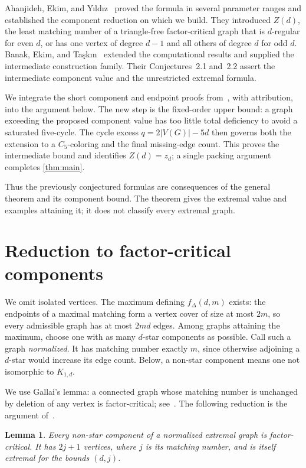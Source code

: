 \documentclass[11pt]{article}
\newtheorem{lemma}[theorem]{Lemma}
\theoremstyle{definition}
\theoremstyle{remark}
\newcommand{\fDelta}{f_{\Delta}}
\begin{document}
Ahanjideh, Ekim, and Y\i ld\i z~\cite{AEY2022} proved the formula in several
parameter ranges and established the component reduction on which we build.
They introduced $Z(d)$, the least matching number of a triangle-free
factor-critical graph that is $d$-regular for even $d$, or has one vertex of
degree $d-1$ and all others of degree $d$ for odd $d$. Banak, Ekim, and
Ta\c{s}k\i n~\cite{BET2023} extended the computational results and supplied
the intermediate construction family. Their Conjectures~2.1 and~2.2 assert
the intermediate component value and the unrestricted extremal formula.

We integrate the short component and endpoint proofs from~\cite{AEY2022},
with attribution, into the argument below. The new step is the fixed-order
upper bound: a graph exceeding the proposed component value has too little
total deficiency to avoid a saturated five-cycle. The cycle excess
$q=2|V(G)|-5d$ then governs both the extension to a $C_5$-coloring and the
final missing-edge count. This proves the intermediate bound and identifies
$Z(d)=z_d$; a single packing argument completes \cref{thm:main}.

Thus the previously conjectured formulas are consequences of the general
theorem and its component bound. The theorem gives the extremal value and
examples attaining it; it does not classify every extremal graph.

\section{Reduction to factor-critical components}\label{sec:reduction}

We omit isolated vertices. The maximum defining $\fDelta(d,m)$ exists:
the endpoints of a maximal matching form a vertex cover of size at most
$2m$, so every admissible graph has at most $2md$ edges. Among graphs attaining
the maximum, choose one with as many $d$-star components as possible.
Call such a graph \emph{normalized}. It has matching number exactly $m$,
since otherwise adjoining a $d$-star would increase its edge count.
Below, a non-star component means one not isomorphic to $K_{1,d}$.

We use Gallai's lemma: a connected graph whose matching number is unchanged
by deletion of any vertex is factor-critical; see~\cite[Lemma~2.2]{AEY2022}.
The following reduction is the argument of~\cite[Lemma~2.4]{AEY2022}.

\begin{lemma}\label{lem:star-reduction}
Every non-star component of a normalized extremal graph is factor-critical.
It has $2j+1$ vertices, where $j$ is its matching number, and is itself
extremal for the bounds $(d,j)$.
\end{lemma}
\end{document}
